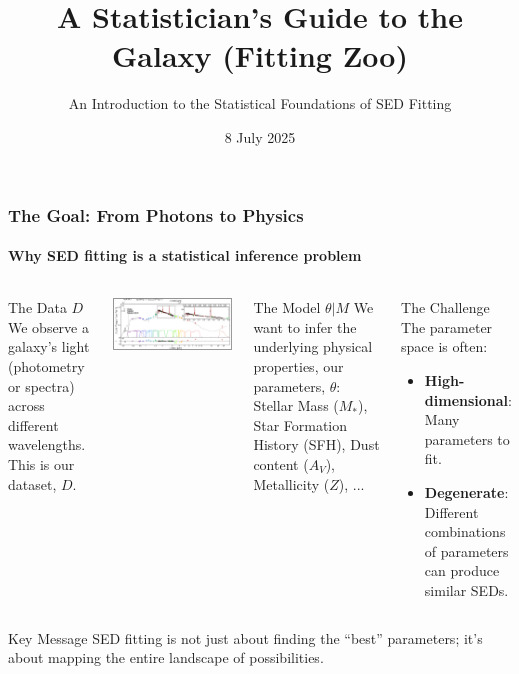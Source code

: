 \documentclass[aspectratio=169]{beamer}
\title{A Statistician's Guide to the Galaxy (Fitting Zoo)}
\subtitle{An Introduction to the Statistical Foundations of SED Fitting}
\date{8 July 2025}
\newcommand{\keyterm}[1]{\textbf{\textcolor{C0}{#1}}}
\begin{document}
\begin{frame}
    \titlepage
\end{frame}

\begin{frame}
    \frametitle{The Goal: From Photons to Physics}
    \framesubtitle{Why SED fitting is a statistical inference problem}
    \begin{columns}[T]
        \begin{block}{The Data $D$}
            We observe a galaxy's light (photometry or spectra) across different wavelengths. This is our dataset, $D$.
        \end{block}
        \includegraphics[width=\textwidth]{figures/sed.png}
        
        \begin{block}{The Model $\theta|M$}
            We want to infer the underlying physical properties, our parameters, $\theta$: Stellar Mass ($M_*$), Star Formation History (SFH), Dust content ($A_V$), Metallicity ($Z$), ...
        \end{block}
        \begin{block}{The Challenge}
            The parameter space is often:
            \begin{itemize}
                \item \keyterm{High-dimensional}: Many parameters to fit.
                \item \keyterm{Degenerate}: Different combinations of parameters can produce similar SEDs.
            \end{itemize}
        \end{block}
    \end{columns}
    \vspace{1em}
    \begin{alertblock}{Key Message}
        SED fitting is not just about finding the ``best'' parameters; it's about mapping the entire landscape of possibilities.
    \end{alertblock}
\end{frame}
\end{document}

